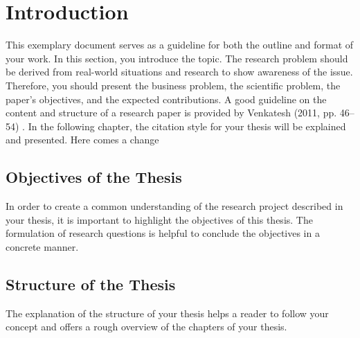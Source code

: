\chapter{Introduction}

This exemplary document serves as a guideline for both the outline and format of your work. In this section, you introduce the topic. The research problem should be derived from real-world situations and research to show awareness of the issue. Therefore, you should present the business problem, the scientific problem, the paper’s objectives, and the expected contributions. A good guideline on the content and structure of a research paper is provided by Venkatesh (2011, pp. 46–54) \citet{tannenbaum}. In the following chapter, the citation style for your thesis will be explained and presented. Here comes a change

\section{Objectives of the Thesis}
In order to create a common understanding of the research project described in your thesis, it is important to highlight the objectives of this thesis. The formulation of research questions is helpful to conclude the objectives in a concrete manner.
\section{Structure of the Thesis}
The explanation of the structure of your thesis helps a reader to follow your concept and offers a rough overview of the chapters of your thesis.